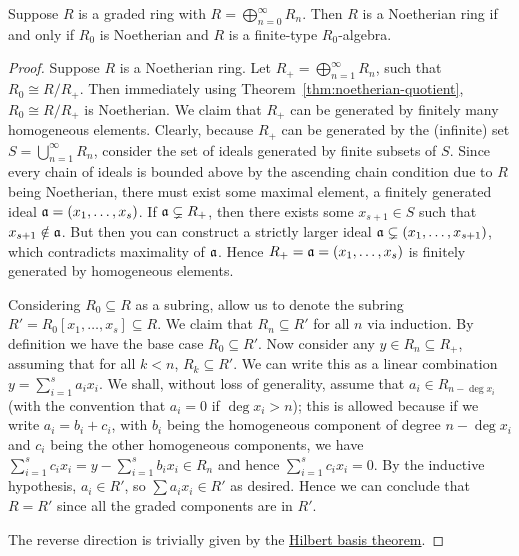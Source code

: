 \begin{proposition}
    Suppose \(R\) is a graded ring with \(R = \bigoplus_{n=0}^\infty R_n\).
    Then \(R\) is a Noetherian ring if and only if \(R_0\) is Noetherian and \(R\) is a finite-type \(R_0\)-algebra.
\end{proposition}
\begin{proof}
    Suppose \(R\) is a Noetherian ring.
    Let \(R_+ = \bigoplus_{n=1}^\infty R_n\), such that \(R_0 \cong R/R_+\).
    Then immediately using Theorem~\ref{thm:noetherian-quotient},
    \(R_0 \cong R/R_+\) is Noetherian.
    We claim that \(R_+\) can be generated by finitely many homogeneous elements.
    Clearly, because \(R_+\) can be generated by the (infinite) set \(S = \bigcup_{n=1}^\infty R_n\),
    consider the set of ideals generated by finite subsets of \(S\).
    Since every chain of ideals is bounded above by the ascending chain condition due to \(R\) being Noetherian,
    there must exist some maximal element, a finitely generated ideal \(\mathfrak{a} = (x_1,\hdots,x_s)\).
    If \(\mathfrak{a} \subsetneq R_+\), then there exists some \(x_{s+1} \in S\) such that \(x_{s+1} \notin \mathfrak{a}\).
    But then you can construct a strictly larger ideal \(\mathfrak{a} \subsetneq (x_1,\hdots,x_{s+1})\),
    which contradicts maximality of \(\mathfrak{a}\).
    Hence \(R_+ = \mathfrak{a} = (x_1,\hdots,x_s)\) is finitely generated by homogeneous elements.

    Considering \(R_0 \subseteq R\) as a subring,
    allow us to denote the subring \(R' = R_0[x_1,\hdots,x_s] \subseteq R\).
    We claim that \(R_n \subseteq R'\) for all \(n\) via induction.
    By definition we have the base case \(R_0 \subseteq R'\).
    Now consider any \(y \in R_n \subseteq R_+\), assuming that for all \(k < n\), \(R_k \subseteq R'\).
    We can write this as a linear combination \(y = \sum_{i=1}^s a_i x_i\).
    We shall, without loss of generality, assume that \(a_i \in R_{n-\deg x_i}\)
    (with the convention that \(a_i = 0\) if \(\deg x_i > n\));
    this is allowed because if we write \(a_i = b_i + c_i\),
    with \(b_i\) being the homogeneous component of degree \(n - \deg x_i\)
    and \(c_i\) being the other homogeneous components,
    we have \(\sum_{i=1}^s c_i x_i = y - \sum_{i=1}^s b_i x_i \in R_n\)
    and hence \(\sum_{i=1}^s c_i x_i = 0\).
    By the inductive hypothesis, \(a_i \in R'\), so \(\sum a_i x_i \in R'\) as desired.
    Hence we can conclude that \(R = R'\) since all the graded components are in \(R'\).

    The reverse direction is trivially given by the \hyperref[cor:hilbert-basis]{Hilbert basis theorem}.
\end{proof}

